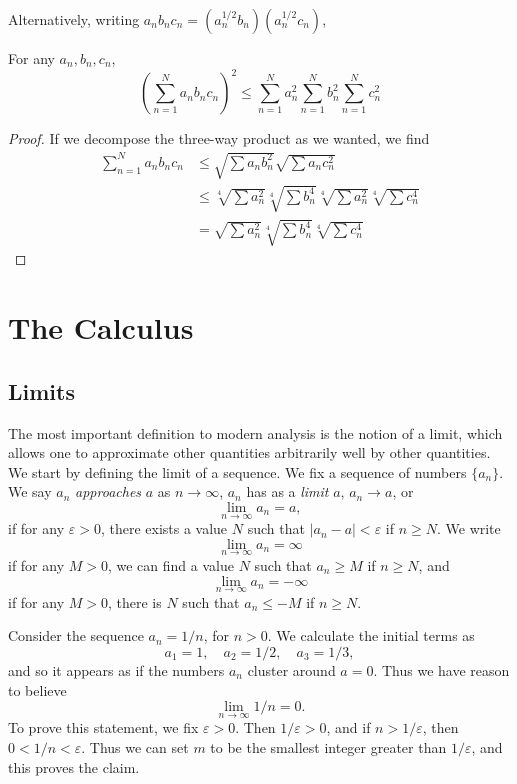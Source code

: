 Alternatively, writing $a_nb_nc_n = (a_n^{1/2}b_n)(a_n^{1/2}c_n)$,

\begin{theorem}
    For any $a_n,b_n,c_n$,
    \[ \left( \sum_{n = 1}^N a_nb_nc_n \right)^2 \leq \sum_{n = 1}^N a_n^2 \sum_{n = 1}^N b_n^2 \sum_{n = 1}^N c_n^2 \]
\end{theorem}
\begin{proof}
    If we decompose the three-way product as we wanted, we find
    \begin{align*}
        \sum_{n = 1}^N a_nb_nc_n &\leq \sqrt{\sum a_nb_n^2} \sqrt{\sum a_nc_n^2}\\
        &\leq \sqrt[4]{\sum a_n^2} \sqrt[4]{\sum b_n^4} \sqrt[4]{\sum a_n^2} \sqrt[4]{\sum c_n^4}\\
        &= \sqrt{\sum a_n^2} \sqrt[4]{\sum b_n^4} \sqrt[4]{\sum c_n^4}
    \end{align*}
\end{proof}






\part{The Calculus}

\chapter{Limits}

The most important definition to modern analysis is the notion of a limit, which allows one to approximate other quantities arbitrarily well by other quantities. We start by defining the limit of a sequence. We fix a sequence of numbers $\{ a_n \}$. We say $a_n$ \emph{approaches} $a$ as $n \to \infty$, $a_n$ has as a \emph{limit} $a$, $a_n \to a$, or
%
\[ \lim_{n \to \infty} a_n = a, \]
%
if for any $\varepsilon > 0$, there exists a value $N$ such that $|a_n - a| < \varepsilon$ if $n \geq N$. We write
%
\[ \lim_{n \to \infty} a_n = \infty \]
%
if for any $M > 0$, we can find a value $N$ such that $a_n \geq M$ if $n \geq N$, and
%
\[ \lim_{n \to \infty} a_n = -\infty \]
%
if for any $M > 0$, there is $N$ such that $a_n \leq -M$ if $n \geq N$.

\begin{example}
    Consider the sequence $a_n = 1/n$, for $n > 0$. We calculate the initial terms as
    \[ a_1 = 1, \quad a_2 = 1/2, \quad a_3 = 1/3, \]
    and so it appears as if the numbers $a_n$ cluster around $a = 0$. Thus we have reason to believe
    \[ \lim_{n \to \infty} 1/n = 0. \]
    To prove this statement, we fix $\varepsilon > 0$. Then $1/\varepsilon > 0$, and if $n > 1/\varepsilon$, then $0 < 1/n < \varepsilon$. Thus we can set $m$ to be the smallest integer greater than $1/\varepsilon$, and this proves the claim.
\end{example}

